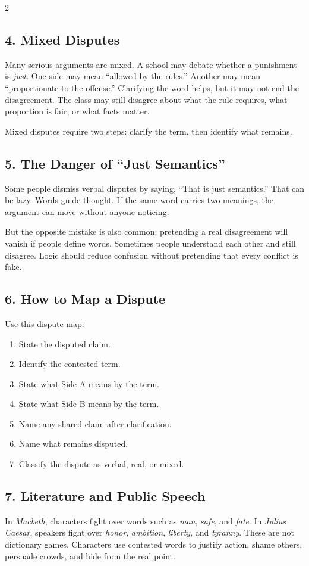 \documentclass[12pt]{article}
\begin{document}
\begin{multicols}{2}
\subsection*{4. Mixed Disputes}
Many serious arguments are mixed. A school may debate whether a punishment is \textit{just}. One side may mean ``allowed by the rules.'' Another may mean ``proportionate to the offense.'' Clarifying the word helps, but it may not end the disagreement. The class may still disagree about what the rule requires, what proportion is fair, or what facts matter.

Mixed disputes require two steps: clarify the term, then identify what remains.

\subsection*{5. The Danger of ``Just Semantics''}
Some people dismiss verbal disputes by saying, ``That is just semantics.'' That can be lazy. Words guide thought. If the same word carries two meanings, the argument can move without anyone noticing.

But the opposite mistake is also common: pretending a real disagreement will vanish if people define words. Sometimes people understand each other and still disagree. Logic should reduce confusion without pretending that every conflict is fake.

\subsection*{6. How to Map a Dispute}
Use this dispute map:
\begin{enumerate}[leftmargin=*,itemsep=0.12em]
\item State the disputed claim.
\item Identify the contested term.
\item State what Side A means by the term.
\item State what Side B means by the term.
\item Name any shared claim after clarification.
\item Name what remains disputed.
\item Classify the dispute as verbal, real, or mixed.
\end{enumerate}

\subsection*{7. Literature and Public Speech}
In \textit{Macbeth}, characters fight over words such as \textit{man}, \textit{safe}, and \textit{fate}. In \textit{Julius Caesar}, speakers fight over \textit{honor}, \textit{ambition}, \textit{liberty}, and \textit{tyranny}. These are not dictionary games. Characters use contested words to justify action, shame others, persuade crowds, and hide from the real point.


\end{multicols}
\end{document}
